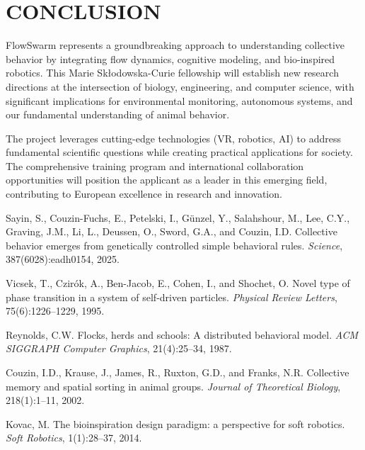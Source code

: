 \documentclass[11pt,a4paper]{article}
\begin{document}
\section{CONCLUSION}

FlowSwarm represents a groundbreaking approach to understanding collective behavior by integrating flow dynamics, cognitive modeling, and bio-inspired robotics. This Marie Skłodowska-Curie fellowship will establish new research directions at the intersection of biology, engineering, and computer science, with significant implications for environmental monitoring, autonomous systems, and our fundamental understanding of animal behavior.

The project leverages cutting-edge technologies (VR, robotics, AI) to address fundamental scientific questions while creating practical applications for society. The comprehensive training program and international collaboration opportunities will position the applicant as a leader in this emerging field, contributing to European excellence in research and innovation.


\begin{thebibliography}{9}

Sayin, S., Couzin-Fuchs, E., Petelski, I., Günzel, Y., Salahshour, M., Lee, C.Y., Graving, J.M., Li, L., Deussen, O., Sword, G.A., and Couzin, I.D.
\newblock Collective behavior emerges from genetically controlled simple behavioral rules.
\newblock \emph{Science}, 387(6028):eadh0154, 2025.

Vicsek, T., Czirók, A., Ben-Jacob, E., Cohen, I., and Shochet, O.
\newblock Novel type of phase transition in a system of self-driven particles.
\newblock \emph{Physical Review Letters}, 75(6):1226--1229, 1995.

Reynolds, C.W.
\newblock Flocks, herds and schools: A distributed behavioral model.
\newblock \emph{ACM SIGGRAPH Computer Graphics}, 21(4):25--34, 1987.

Couzin, I.D., Krause, J., James, R., Ruxton, G.D., and Franks, N.R.
\newblock Collective memory and spatial sorting in animal groups.
\newblock \emph{Journal of Theoretical Biology}, 218(1):1--11, 2002.

Kovac, M.
\newblock The bioinspiration design paradigm: a perspective for soft robotics.
\newblock \emph{Soft Robotics}, 1(1):28--37, 2014.

\end{thebibliography}
\end{document}
